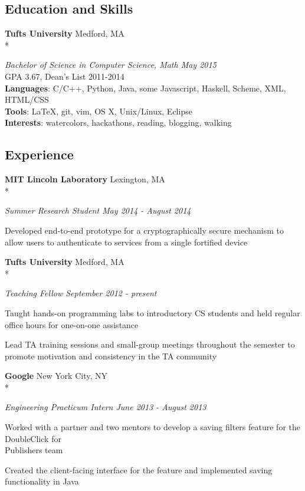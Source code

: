 \documentclass{article}
\newcommand{\position}[2]{
  \textit{#1 \hfill #2}
}
\newcommand{\affiliation}[2]{
  \textbf{#1} \hfill #2 \\*
}
\newenvironment{achievements}{
  \begin{compactitem} }{
  \end{compactitem}
}
\newcommand{\skill}[2]{
  \textbf{#1}: #2
}
\begin{document}
\subsection*{Education and Skills}
  \affiliation{Tufts University}                             {Medford, MA}
    \position{Bachelor of Science in Computer Science, Math} {May 2015} \\
  GPA 3.67, Dean's List 2011-2014 \\
  \skill{Languages} {C/C++, Python, Java, some Javascript,
                      Haskell, Scheme, XML, HTML/CSS}\\
  \skill{Tools}     {LaTeX, git, vim, OS X, Unix/Linux, Eclipse}\\
  \skill{Interests} {watercolors, hackathons, reading, blogging, walking}

\subsection*{Experience}
  \affiliation{MIT Lincoln Laboratory}       {Lexington, MA}
    \position {Summer Research Student}      {May 2014 - August 2014}
    \begin{achievements}
      \item Developed end-to-end prototype for a cryptographically secure
      mechanism to allow users to authenticate to services from a single
      fortified device
    \end{achievements}
    \smallskip

  \affiliation{Tufts University}   {Medford, MA}
    \position {Teaching Fellow} {September 2012 - present}
    \begin{achievements}
      \item Taught hands-on programming labs to introductory CS students and
      held regular office hours for one-on-one assistance
      \item Lead TA training sessions and small-group meetings throughout the
      semester to promote motivation and consistency in the TA community
    \end{achievements}
    \smallskip

  \affiliation{Google}                       {New York City, NY}
    \position {Engineering Practicum Intern} {June 2013 - August 2013}
    \begin{achievements}
      \item Worked with a partner and two mentors to develop a
            saving filters feature for the DoubleClick for \\ Publishers team
      \item Created the client-facing interface for the feature and
      implemented saving functionality in Java
    \end{achievements}
    \smallskip
\end{document}
